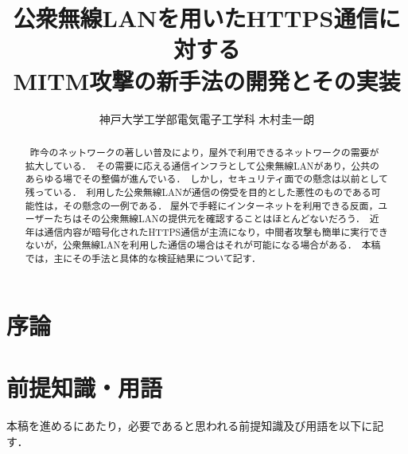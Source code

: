 \documentclass[dvipdfmx]{jsarticle}
\title{公衆無線LANを用いたHTTPS通信に対する\\MITM攻撃の新手法の開発とその実装}
\author{神戸大学工学部電気電子工学科 木村圭一朗}
\begin{document}
    \maketitle
    \begin{abstract}
        \ 昨今のネットワークの著しい普及により，屋外で利用できるネットワークの需要が拡大している．\
        その需要に応える通信インフラとして公衆無線LANがあり，公共のあらゆる場でその整備が進んでいる．\
        しかし，セキュリティ面での懸念は以前として残っている．\
        利用した公衆無線LANが通信の傍受を目的とした悪性のものである可能性は，その懸念の一例である．
        屋外で手軽にインターネットを利用できる反面，ユーザーたちはその公衆無線LANの提供元を確認することはほとんどないだろう．\
        近年は通信内容が暗号化されたHTTPS通信が主流になり，中間者攻撃も簡単に実行できないが，公衆無線LANを利用した通信の場合はそれが可能になる場合がある．\
        本稿では，主にその手法と具体的な検証結果について記す．
        \newline
    \end{abstract}
    \tableofcontents
    \clearpage
    \section{序論}

    \section{前提知識・用語}
        本稿を進めるにあたり，必要であると思われる前提知識及び用語を以下に記す．\
\end{document}
